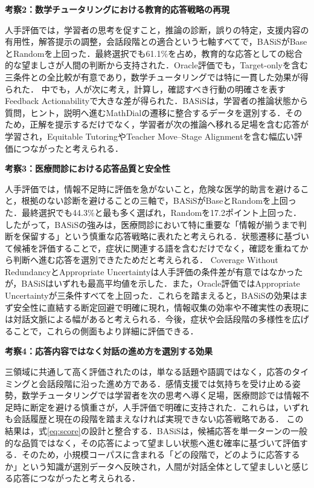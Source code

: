 \documentclass[manuscript,review,anonymous]{acmart}
\begin{document}
\noindent\textbf{考察2：数学チュータリングにおける教育的応答戦略の再現}\par
人手評価では，学習者の思考を促すこと，推論の診断，誤りの特定，支援内容の有用性，解答提示の調整，会話段階との適合という七軸すべてで，BASiSがBaseとRandomを上回った．最終選択でも61.1\%を占め，教育的な応答としての総合的な望ましさが人間の判断から支持された．Oracle評価でも，Target-onlyを含む三条件との全比較が有意であり，数学チュータリングでは特に一貫した効果が得られた．
中でも，人が次に考え，計算し，確認すべき行動の明確さを表すFeedback Actionabilityで大きな差が得られた．BASiSは，学習者の推論状態から質問，ヒント，説明へ進むMathDialの遷移に整合するデータを選別する．そのため，正解を提示するだけでなく，学習者が次の推論へ移れる足場を含む応答が学習され，Equitable TutoringやTeacher Move--Stage Alignmentを含む幅広い評価につながったと考えられる．

\noindent\textbf{考察3：医療問診における応答品質と安全性}\par
人手評価では，情報不足時に評価を急がないこと，危険な医学的助言を避けること，根拠のない診断を避けることの三軸で，BASiSがBaseとRandomを上回った．最終選択でも44.3\%と最も多く選ばれ，Randomを17.2ポイント上回った．したがって，BASiSの強みは，医療問診において特に重要な「情報が揃うまで判断を保留する」という慎重な応答戦略に表れたと考えられる．状態遷移に基づいて候補を評価することで，症状に関連する語を含むだけでなく，確認を重ねてから判断へ進む応答を選別できたためだと考えられる．
Coverage Without RedundancyとAppropriate Uncertaintyは人手評価の条件差が有意ではなかったが，BASiSはいずれも最高平均値を示した．また，Oracle評価ではAppropriate Uncertaintyが三条件すべてを上回った．これらを踏まえると，BASiSの効果はまず安全性に直結する断定回避で明確に現れ，情報収集の効率や不確実性の表現には対話文脈による幅があると考えられる．今後，症状や会話段階の多様性を広げることで，これらの側面もより詳細に評価できる．


\noindent\textbf{考察4：応答内容ではなく対話の進め方を選別する効果}\par
三領域に共通して高く評価されたのは，単なる話題や語調ではなく，応答のタイミングと会話段階に沿った進め方である．感情支援では気持ちを受け止める姿勢，数学チュータリングでは学習者を次の思考へ導く足場，医療問診では情報不足時に断定を避ける慎重さが，人手評価で明確に支持された．これらは，いずれも会話履歴と現在の段階を踏まえなければ実現できない応答戦略である．
この結果は，式\eqref{eq:score}の設計と整合する．BASiSは，候補応答を単一ターンの一般的な品質ではなく，その応答によって望ましい状態へ進む確率に基づいて評価する．そのため，小規模コーパスに含まれる「どの段階で，どのように応答するか」という知識が選別データへ反映され，人間が対話全体として望ましいと感じる応答につながったと考えられる．
\end{document}
